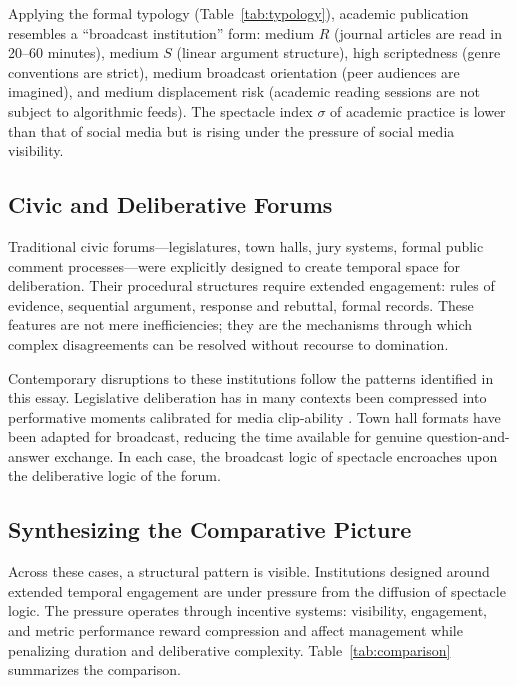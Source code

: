 \documentclass[12pt]{article}
\theoremstyle{definition}
\theoremstyle{plain}
\begin{document}
Applying the formal typology (Table~\ref{tab:typology}), academic publication resembles a ``broadcast institution'' form: medium $R$ (journal articles are read in 20--60 minutes), medium $S$ (linear argument structure), high scripted\-ness (genre conventions are strict), medium broadcast orientation (peer audiences are imagined), and medium displacement risk (academic reading sessions are not subject to algorithmic feeds). The spectacle index $\sigma$ of academic practice is lower than that of social media but is rising under the pressure of social media visibility.

\subsection{Civic and Deliberative Forums}

Traditional civic forums---legislatures, town halls, jury systems, formal public comment processes---were explicitly designed to create temporal space for deliberation. Their procedural structures require extended engagement: rules of evidence, sequential argument, response and rebuttal, formal records. These features are not mere inefficiencies; they are the mechanisms through which complex disagreements can be resolved without recourse to domination.

Contemporary disruptions to these institutions follow the patterns identified in this essay. Legislative deliberation has in many contexts been compressed into performative moments calibrated for media clip-ability \citep{Mutz2015}. Town hall formats have been adapted for broadcast, reducing the time available for genuine question-and-answer exchange. In each case, the broadcast logic of spectacle encroaches upon the deliberative logic of the forum.

\subsection{Synthesizing the Comparative Picture}

Across these cases, a structural pattern is visible. Institutions designed around extended temporal engagement are under pressure from the diffusion of spectacle logic. The pressure operates through incentive systems: visibility, engagement, and metric performance reward compression and affect management while penalizing duration and deliberative complexity. Table~\ref{tab:comparison} summarizes the comparison.
\end{document}
